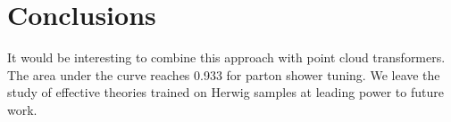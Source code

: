 \section{Conclusions}\label{sec:conclusions}

It would be interesting to combine this approach with point cloud
transformers. The area under the curve reaches 0.933 for parton shower
tuning. We leave the study of effective theories trained on Herwig
samples at leading power to future work.

